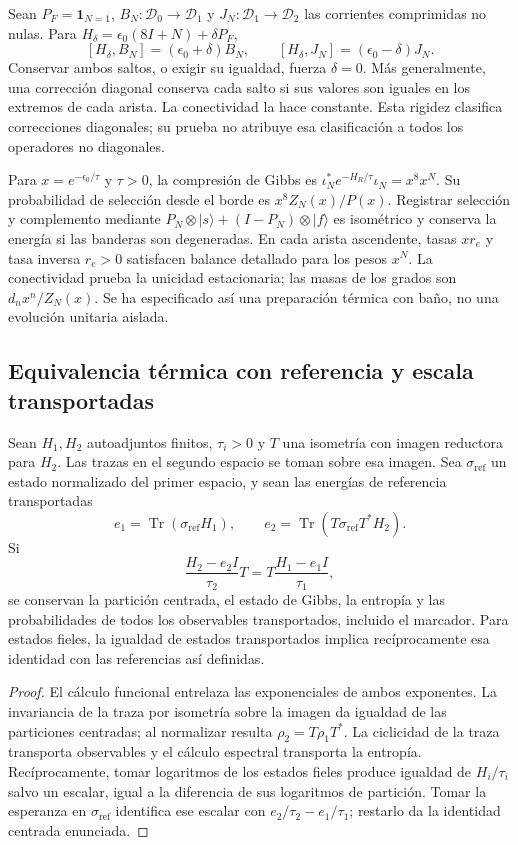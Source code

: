 Sean $P_F=\mathbf1_{N=1}$, $B_N:\mathcal D_0\to\mathcal D_1$ y
$J_N:\mathcal D_1\to\mathcal D_2$ las corrientes comprimidas no nulas.
Para $H_\delta=\epsilon_0(8I+N)+\delta P_F$,
\[
 [H_\delta,B_N]=(\epsilon_0+\delta)B_N,
 \qquad[H_\delta,J_N]=(\epsilon_0-\delta)J_N.
\]
Conservar ambos saltos, o exigir su igualdad, fuerza $\delta=0$.
Más generalmente, una corrección diagonal conserva cada salto si sus
valores son iguales en los extremos de cada arista. La conectividad la
hace constante. Esta rigidez clasifica correcciones diagonales; su prueba
no atribuye esa clasificación a todos los operadores no diagonales.

Para $x=e^{-\epsilon_0/\tau}$ y $\tau>0$, la compresión de Gibbs es
$\iota_N^*e^{-H_R/\tau}\iota_N=x^8x^N$. Su probabilidad de selección
desde el borde es $x^8Z_N(x)/P(x)$. Registrar selección y complemento
mediante $P_N\otimes|s\rangle+(I-P_N)\otimes|f\rangle$ es isométrico
y conserva la energía si las banderas son degeneradas. En cada arista
ascendente, tasas $xr_e$ y tasa inversa $r_e>0$ satisfacen balance
detallado para los pesos $x^N$. La conectividad prueba la unicidad
estacionaria; las masas de los grados son $d_nx^n/Z_N(x)$. Se ha
especificado así una preparación térmica con baño, no una evolución
unitaria aislada.

\subsection{Equivalencia térmica con referencia y escala transportadas}
\label{sec:ii-ter27-equivalencia}

\begin{theorem}
\label{thm:ii-ter27-transporte}
Sean $H_1,H_2$ autoadjuntos finitos, $\tau_i>0$ y $T$ una isometría
con imagen reductora para $H_2$. Las trazas en el segundo espacio se
toman sobre esa imagen. Sea $\sigma_{\mathrm{ref}}$ un estado normalizado
del primer espacio, y sean las energías de referencia transportadas
\[
 e_1=\operatorname{Tr}(\sigma_{\mathrm{ref}}H_1),\qquad
 e_2=\operatorname{Tr}(T\sigma_{\mathrm{ref}}T^*H_2).
\]
Si
\[
 \frac{H_2-e_2I}{\tau_2}T
 =T\frac{H_1-e_1I}{\tau_1},
\]
se conservan la partición centrada, el estado de Gibbs, la entropía y
las probabilidades de todos los observables transportados, incluido el
marcador. Para estados fieles, la igualdad de estados transportados
implica recíprocamente esa identidad con las referencias así definidas.
\end{theorem}
\begin{proof}
El cálculo funcional entrelaza las exponenciales de ambos exponentes.
La invariancia de la traza por isometría sobre la imagen da igualdad de
las particiones centradas; al normalizar resulta $\rho_2=T\rho_1T^*$.
La ciclicidad de la traza transporta observables y el cálculo espectral
transporta la entropía. Recíprocamente, tomar logaritmos de los estados
fieles produce igualdad de $H_i/\tau_i$ salvo un escalar, igual a la
diferencia de sus logaritmos de partición. Tomar la esperanza en
$\sigma_{\mathrm{ref}}$ identifica ese escalar con
$e_2/\tau_2-e_1/\tau_1$; restarlo da la identidad centrada enunciada.
\end{proof}

